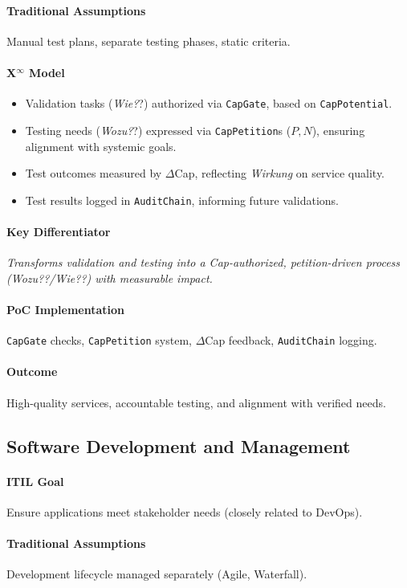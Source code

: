 \documentclass[12pt, a4paper]{scrartcl}
\newcommand{\Xinf}{X$^\infty$}                        %
\newcommand{\DeltaCap}{$\Delta$Cap}                    %
\newcommand{\CapPotential}{\texttt{CapPotential}}    %
\newcommand{\Wirkung}{\textit{Wirkung}}                 %
\newcommand{\CapGate}{\texttt{CapGate}}
\newcommand{\AuditChain}{\texttt{AuditChain}}
\newcommand{\CapPetition}{\texttt{CapPetition}}        %
\newcommand{\Wozu}{\textit{Wozu?}}                      %
\newcommand{\Wie}{\textit{Wie?}}                        %
\begin{document}
\paragraph{Traditional Assumptions} Manual test plans, separate testing phases, static criteria.
\paragraph*{\Xinf{} Model}
\begin{itemize}
    \item Validation tasks (\Wie?) authorized via \CapGate{}, based on \CapPotential{}.
    \item Testing needs (\Wozu?) expressed via \CapPetition{}s ($P, N$), ensuring alignment with systemic goals.
    \item Test outcomes measured by \DeltaCap{}, reflecting \Wirkung{} on service quality.
    \item Test results logged in \AuditChain{}, informing future validations.
\end{itemize}
\paragraph{Key Differentiator} \textit{Transforms validation and testing into a Cap-authorized, petition-driven process (\Wozu?/\Wie?) with measurable impact.}
\paragraph{PoC Implementation} \CapGate{} checks, \CapPetition{} system, \DeltaCap{} feedback, \AuditChain{} logging.
\paragraph{Outcome} High-quality services, accountable testing, and alignment with verified needs.

\subsection{Software Development and Management} %
\paragraph{ITIL Goal} Ensure applications meet stakeholder needs (closely related to DevOps).
\paragraph{Traditional Assumptions} Development lifecycle managed separately (Agile, Waterfall).
\end{document}
